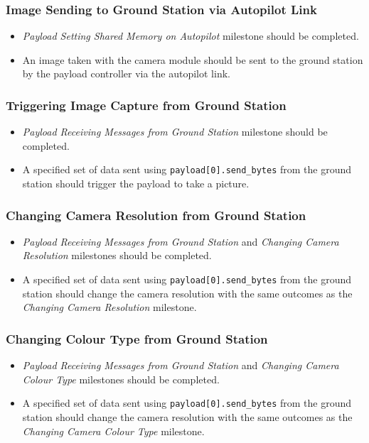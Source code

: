 	\subsubsection{Image Sending to Ground Station via Autopilot Link}
		\begin{itemize}
			\item 	\emph{Payload Setting Shared Memory on Autopilot} milestone
				should be completed.
			\item 	An image taken with the camera module should be sent to the
				ground station by the payload controller via the autopilot link.
		\end{itemize}


	\subsubsection{Triggering Image Capture from Ground Station}
		\begin{itemize}
			\item 	\emph{Payload Receiving Messages from Ground Station} milestone
				should be completed.
			\item 	A specified set of data sent using \verb+payload[0].send_bytes+
				from the ground station should trigger the payload to take a picture.
		\end{itemize}

	\subsubsection{Changing Camera Resolution from Ground Station}
		\begin{itemize}
			\item 	\emph{Payload Receiving Messages from Ground Station} and 
				\emph{Changing Camera Resolution} milestones should be completed.
			\item 	A specified set of data sent using \verb+payload[0].send_bytes+
				from the ground station should change the camera resolution with 
				the same outcomes as the \emph{Changing Camera Resolution} milestone.
		\end{itemize}


	\subsubsection{Changing Colour Type from Ground Station}
		\begin{itemize}
			\item 	\emph{Payload Receiving Messages from Ground Station} and 
				\emph{Changing Camera Colour Type} milestones should be completed.
			\item 	A specified set of data sent using \verb+payload[0].send_bytes+
				from the ground station should change the camera resolution with 
				the same outcomes as the \emph{Changing Camera Colour Type} milestone.
		\end{itemize}

